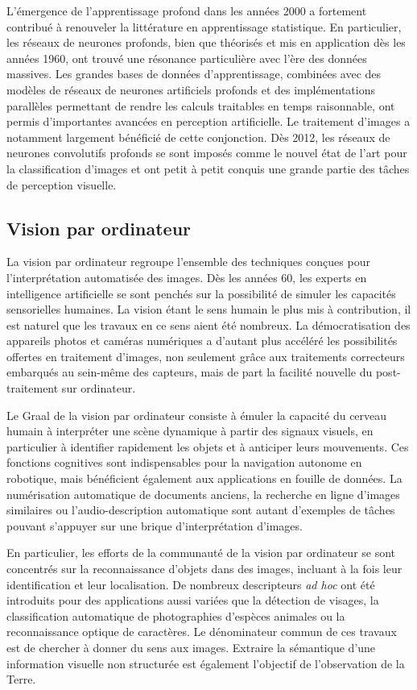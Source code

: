L'émergence de l'apprentissage profond dans les années 2000 a fortement contribué à renouveler la littérature en apprentissage statistique. En particulier, les réseaux de neurones profonds, bien que théorisés et mis en application dès les années 1960, ont trouvé une résonance particulière avec l'ère des données massives. Les grandes bases de données d'apprentissage, combinées avec des modèles de réseaux de neurones artificiels profonds et des implémentations parallèles permettant de rendre les calculs traitables en temps raisonnable, ont permis d'importantes avancées en perception artificielle. Le traitement d'images a notamment largement bénéficié de cette conjonction. Dès 2012, les réseaux de neurones convolutifs profonds se sont imposés comme le nouvel état de l'art pour la classification d'images et ont petit à petit conquis une grande partie des tâches de perception visuelle.

\subsection{Vision par ordinateur}

La vision par ordinateur regroupe l'ensemble des techniques conçues pour l'interprétation automatisée des images. Dès les années 60, les experts en intelligence artificielle se sont penchés sur la possibilité de simuler les capacités sensorielles humaines. La vision étant le sens humain le plus mis à contribution, il est naturel que les travaux en ce sens aient été nombreux. La démocratisation des appareils photos et caméras numériques a d'autant plus accéléré les possibilités offertes en traitement d'images, non seulement grâce aux traitements correcteurs embarqués au sein-même des capteurs, mais de part la facilité nouvelle du post-traitement sur ordinateur.

Le Graal de la vision par ordinateur consiste à émuler la capacité du cerveau humain à interpréter une scène dynamique à partir des signaux visuels, en particulier à identifier rapidement les objets et à anticiper leurs mouvements. Ces fonctions cognitives sont indispensables pour la navigation autonome en robotique, mais bénéficient également aux applications en fouille de données. La numérisation automatique de documents anciens, la recherche en ligne d'images similaires ou l'audio-description automatique sont autant d'exemples de tâches pouvant s'appuyer sur une brique d'interprétation d'images.

En particulier, les efforts de la communauté de la vision par ordinateur se sont concentrés sur la reconnaissance d'objets dans des images, incluant à la fois leur identification et leur localisation. De nombreux descripteurs \emph{ad hoc} ont été introduits pour des applications aussi variées que la détection de visages, la classification automatique de photographies d'espèces animales ou la reconnaissance optique de caractères. Le dénominateur commun de ces travaux est de chercher à donner du sens aux images. Extraire la sémantique d'une information visuelle non structurée est également l'objectif de l'observation de la Terre.

